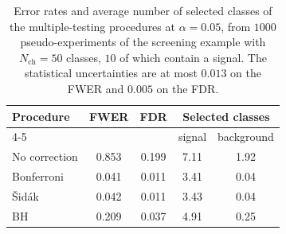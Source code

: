 \begin{table}[htbp]
  \centering
  \caption{Error rates and average number of selected classes of the multiple-testing procedures at $\alpha=0.05$, from $1000$ pseudo-experiments of the screening example with $N_\text{ch}=50$ classes, $10$ of which contain a signal. The statistical uncertainties are at most $0.013$ on the FWER and $0.005$ on the FDR.}
  \label{tab:screening_rates}
  \begin{tabular}{lcccc}
    \toprule
    Procedure & FWER & FDR & \multicolumn{2}{c}{Selected classes} \\
    \cmidrule(lr){4-5}
     & & & signal & background \\
    \midrule
    No correction & 0.853 & 0.199 & 7.11 & 1.92 \\
    Bonferroni & 0.041 & 0.011 & 3.41 & 0.04 \\
    \v{S}id\'ak & 0.042 & 0.011 & 3.43 & 0.04 \\
    BH & 0.209 & 0.037 & 4.91 & 0.25 \\
    \bottomrule
  \end{tabular}
\end{table}
